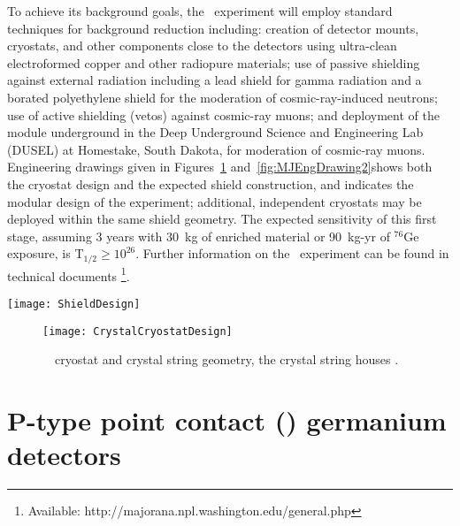To achieve its background goals, the \MJ~experiment will employ standard techniques for background reduction including: creation of detector mounts, cryostats, and other components close to the detectors using ultra-clean electroformed copper and other radiopure materials; use of passive shielding against external radiation including a lead shield for gamma radiation and a borated polyethylene shield for the moderation of cosmic-ray-induced neutrons; use of active shielding (vetos) against cosmic-ray muons; and deployment of the module underground in the Deep Underground Science and Engineering Lab (DUSEL) at Homestake, South Dakota, for moderation of cosmic-ray muons.  Engineering drawings given in Figures~\ref{fig:MJEngDrawing1} and~\ref{fig:MJEngDrawing2}shows both the cryostat design and the expected shield construction, and indicates the modular design of the experiment; additional, independent cryostats may be deployed within the same shield geometry.  The expected sensitivity of this first stage, 
assuming 3 years with 30~kg of enriched material or 90~kg-yr of $^{76}$Ge
exposure, is T$_{1/2}\geq 10^{26}$.  Further information on the
\MJ~experiment can be found in technical documents \footnote{Available:
http://majorana.npl.washington.edu/general.php}. 

	
		\begin{sidewaysfigure}
			\centering		
			\def\figheight{0.45\textheight}
			\texttt{[image: ShieldDesign]}
			\caption[\MJ~\minmod~shield geometry]{\MJ~\minmod~shield geometry.  The modular design of the shield will 
			enable a phased deployment of cryostats, allowing detectors to be easily added after commission of the experiment.}
			\label{fig:MJEngDrawing2}
		\end{sidewaysfigure}
	
		\begin{figure}
			\centering		
			\def\figheight{0.45\textheight}
			\texttt{[image: CrystalCryostatDesign]}
			\caption[\MJ~\minmod~cryostat and crystal string geometry]{\MJ~\minmod~cryostat and crystal string geometry, the
			crystal string houses .}
			\label{fig:MJEngDrawing1}
		\end{figure}

	
	\section{P-type point contact (\ppc) germanium detectors}
	\label{sec:PPCDets}

